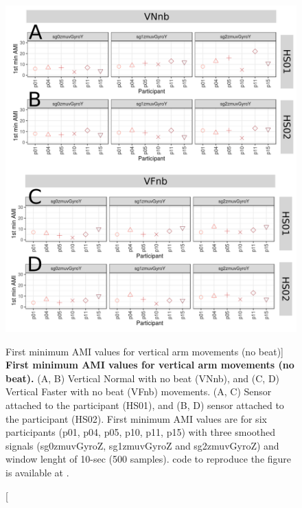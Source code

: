 \begin{figure}
\centering
\includegraphics[width=1.0\textwidth]{ami_Vnb_w10}
	\caption
	[First minimum AMI values for vertical arm movements (no beat)]{
	{\bf First minimum AMI values for vertical arm movements (no beat).}
		(A, B) Vertical Normal with no beat (VNnb), and 
		(C, D) Vertical Faster with no beat (VFnb) movements.
		(A, C) Sensor attached to the participant (HS01), and
		(B, D) sensor attached to the participant (HS02).
		First minimum AMI values are for six participants 
		(p01, p04, p05, p10, p11, p15) with three smoothed 
		signals (sg0zmuvGyroZ, sg1zmuvGyroZ and sg2zmuvGyroZ) and 
		window lenght of 10-sec (500 samples).
		\R code to reproduce the figure is available at 
		.
        }
    \label{fig:amiVnb}
\end{figure}

